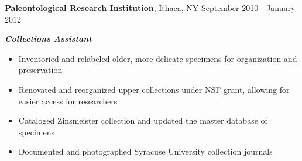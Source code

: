 
\vspace{7pt}

\textbf{Paleontological Research Institution}, Ithaca, NY \hfill September 2010 - January 2012

\textbf{\textit{Collections Assistant}}

\begin{itemize}
    \item Inventoried and relabeled older, more delicate specimens for organization and preservation
    \item Renovated and reorganized upper collections under NSF grant, allowing for easier access for researchers
    \item Cataloged Zinsmeister collection and updated the master database of specimens
    \item Documented and photographed Syracuse University collection journals
\end{itemize}
